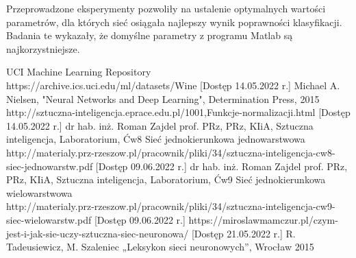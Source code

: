 \documentclass[12pt,twoside]{article}
\begin{document}
Przeprowadzone eksperymenty pozwoliły na ustalenie optymalnych wartości parametrów, dla których sieć osiągała najlepszy wynik poprawności klasyfikacji. Badania te wykazały, że domyślne parametry z programu Matlab są najkorzystniejsze. 

\clearpage



\begin{thebibliography}{4}
 UCI Machine Learning Repository\\https://archive.ics.uci.edu/ml/datasets/Wine [Dostęp 14.05.2022 r.]
 Michael A. Nielsen, "Neural Networks and Deep Learning", Determination Press, 2015
 http://sztuczna-inteligencja.eprace.edu.pl/1001,Funkcje-normalizacji.html [Dostęp 14.05.2022 r.]
dr hab. inż. Roman Zajdel prof. PRz, PRz, KIiA, Sztuczna inteligencja, Laboratorium, Ćw8 Sieć jednokierunkowa jednowarstwowa\\
http://materialy.prz-rzeszow.pl/pracownik/pliki/34/sztuczna-inteligencja-cw8-siec-jednowarstw.pdf [Dostęp 09.06.2022 r.]
dr hab. inż. Roman Zajdel prof. PRz, PRz, KIiA, Sztuczna inteligencja, Laboratorium, Ćw9 Sieć jednokierunkowa wielowarstwowa\\
http://materialy.prz-rzeszow.pl/pracownik/pliki/34/sztuczna-inteligencja-cw9-siec-wielowarstw.pdf [Dostęp 09.06.2022 r.]
https://miroslawmamczur.pl/czym-jest-i-jak-sie-uczy-sztuczna-siec-neuronowa/ [Dostęp 21.05.2022 r.]
 R. Tadeusiewicz, M. Szaleniec „Leksykon sieci neuronowych”, Wrocław 2015


\end{thebibliography}

\clearpage
\end{document}

